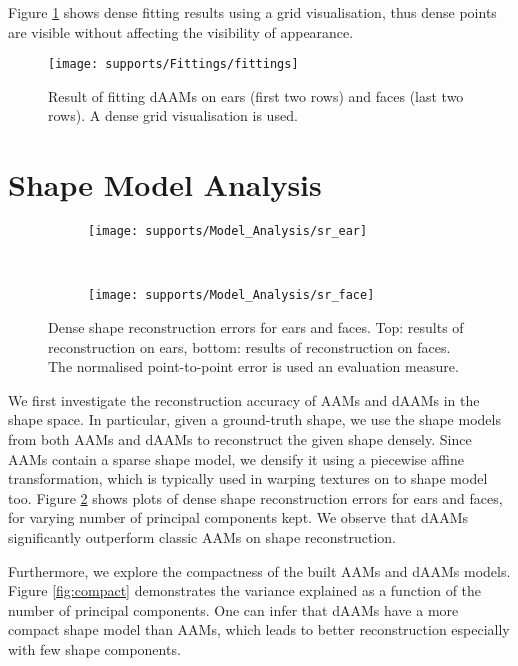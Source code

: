 Figure \ref{fig:fr} shows dense fitting results using a grid visualisation, thus dense points are visible without affecting the visibility of appearance.

\begin{figure}[!t]
\centering
\texttt{[image: supports/Fittings/fittings]}
\caption{Result of fitting dAAMs on ears (first two rows) and faces (last two rows). A dense grid visualisation is used.}
\label{fig:fr}
\end{figure}



\section{Shape Model Analysis}
\label{sec:modelanalysis}


\begin{figure}[!b]
    \centering
    \begin{subfigure}[b]{0.43\textwidth}
            \texttt{[image: supports/Model\_Analysis/sr\_ear]}
    \end{subfigure}
    \\
    \begin{subfigure}[b]{0.43\textwidth}
            \texttt{[image: supports/Model\_Analysis/sr\_face]}
    \end{subfigure}
    \caption{Dense shape reconstruction errors for ears and faces. Top: results of reconstruction on ears, bottom: results of reconstruction on faces. The normalised point-to-point error is used an evaluation measure.}
    \label{fig:rc_face}
\end{figure}


We first investigate the reconstruction accuracy of AAMs and dAAMs in the shape space. In particular, given a ground-truth shape, we use the shape models from both AAMs and dAAMs to reconstruct the given shape densely. Since AAMs contain a sparse shape model, we densify it using a piecewise affine transformation, which is typically used in warping textures on to shape model too. Figure \ref{fig:rc_face} shows plots of dense shape reconstruction errors for ears and faces, for varying number of principal components kept. We observe that dAAMs significantly outperform classic AAMs on shape reconstruction. 


Furthermore, we explore the compactness of the built AAMs and dAAMs models. 
Figure \ref{fig:compact} demonstrates the variance explained as a function of the number of principal components. One can infer that dAAMs have a more compact shape model than AAMs, which leads to better reconstruction especially with few shape components.

